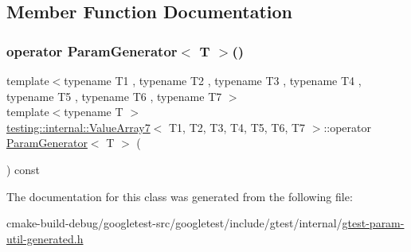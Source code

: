 \subsection{Member Function Documentation}
\mbox{\label{classtesting_1_1internal_1_1ValueArray7_a4ab41f4a5687896e159c69f581d0a673}} 
\subsubsection{\texorpdfstring{operator ParamGenerator$<$ T $>$()}{operator ParamGenerator< T >()}}
{\footnotesize\ttfamily template$<$typename T1 , typename T2 , typename T3 , typename T4 , typename T5 , typename T6 , typename T7 $>$ \\
template$<$typename T $>$ \\
\mbox{\hyperlink{classtesting_1_1internal_1_1ValueArray7}{testing\+::internal\+::\+Value\+Array7}}$<$ T1, T2, T3, T4, T5, T6, T7 $>$\+::operator \mbox{\hyperlink{classtesting_1_1internal_1_1ParamGenerator}{Param\+Generator}}$<$ T $>$ (\begin{DoxyParamCaption}{ }\end{DoxyParamCaption}) const\hspace{0.3cm}{\ttfamily [inline]}}



The documentation for this class was generated from the following file\+:\begin{DoxyCompactItemize}
\item 
cmake-\/build-\/debug/googletest-\/src/googletest/include/gtest/internal/\mbox{\hyperlink{gtest-param-util-generated_8h}{gtest-\/param-\/util-\/generated.\+h}}\end{DoxyCompactItemize}
